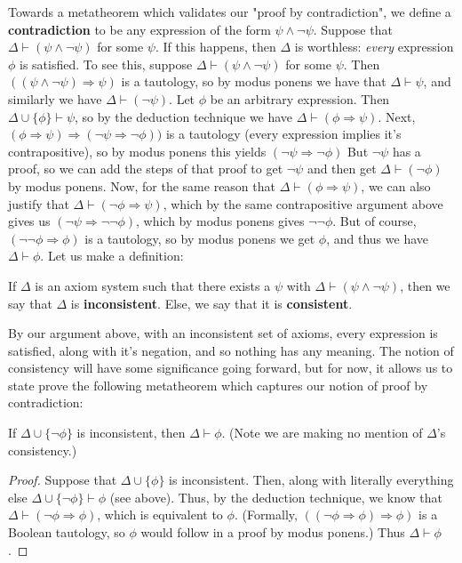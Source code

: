 Towards a metatheorem which validates our "proof by contradiction", we define a \textbf{contradiction} to be any expression of the form $\psi \wedge \neg \psi$. Suppose that $\Delta \vdash (\psi \wedge \neg \psi)$ for some $\psi$. If this happens, then $\Delta$ is worthless: \textit{every} expression $\phi$ is satisfied. To see this, suppose $\Delta \vdash (\psi \wedge \neg \psi)$ for some $\psi$. Then $((\psi \wedge \neg \psi) \Rightarrow \psi)$ is a tautology, so by modus ponens we have that $\Delta \vdash \psi$, and similarly we have $\Delta \vdash (\neg \psi)$. Let $\phi$ be an arbitrary expression. Then $\Delta \cup \{\phi\} \vdash \psi$, so by the deduction technique we have $\Delta \vdash (\phi \Rightarrow \psi)$. Next, $(\phi \Rightarrow \psi) \Rightarrow (\neg \psi \Rightarrow \neg \phi))$ is a tautology (every expression implies it's contrapositive), so by modus ponens this yields $(\neg \psi \Rightarrow \neg \phi)$ But $\neg \psi$ has a proof, so we can add the steps of that proof to get $\neg \psi$ and then get $\Delta \vdash (\neg \phi)$ by modus ponens. Now, for the same reason that $\Delta \vdash (\phi \Rightarrow \psi)$, we can also justify that $\Delta \vdash (\neg \phi \Rightarrow \psi)$, which by the same contrapositive argument above gives us $(\neg \psi \Rightarrow \neg \neg \phi)$, which by modus ponens gives $\neg \neg \phi$. But of course, $(\neg \neg \phi \Rightarrow \phi)$ is a tautology, so by modus ponens we get $\phi$, and thus we have $\Delta \vdash \phi$. Let us make a definition:
\begin{definition}
    If $\Delta$ is an axiom system such that there exists a $\psi$ with $\Delta \vdash (\psi \wedge \neg \psi)$, then we say that $\Delta$ is \textbf{inconsistent}. Else, we say that it is \textbf{consistent}.
\end{definition}
By our argument above, with an inconsistent set of axioms, every expression is satisfied, along with it's negation, and so nothing has any meaning. The notion of consistency will have some significance going forward, but for now, it allows us to state prove the following metatheorem which captures our notion of proof by contradiction:
\begin{theorem}
    If $\Delta \cup \{\neg \phi\}$ is inconsistent, then $\Delta \vdash \phi$. (Note we are making no mention of $\Delta$'s consistency.)
\end{theorem}
\begin{proof}
    Suppose that $\Delta \cup \{\phi\}$ is inconsistent. Then, along with literally everything else $\Delta \cup \{\neg \phi\} \vdash \phi$ (see above). Thus, by the deduction technique, we know that $\Delta \vdash (\neg \phi \Rightarrow \phi)$, which is equivalent to $\phi$. (Formally, $((\neg \phi \Rightarrow \phi) \Rightarrow \phi)$ is a Boolean tautology, so $\phi$ would follow in a proof by modus ponens.) Thus $\Delta \vdash \phi$.
\end{proof}
